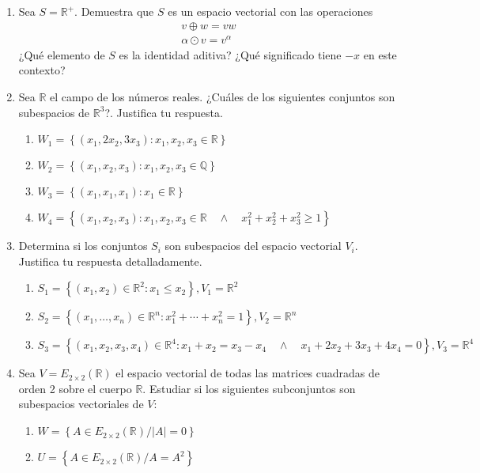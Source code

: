 \documentclass[12pt]{article}
\begin{document}
\begin{enumerate}
  \item Sea $S = \mathbb{R}^+$. Demuestra que $S$ es un espacio vectorial con las operaciones
  \begin{align*}
    v \oplus w = vw\\
    \alpha \odot v = v^{\alpha}
  \end{align*}
  ¿Qué elemento de $S$ es la identidad aditiva? ¿Qué significado tiene $-x$ en este contexto?
  \item Sea $\mathbb{R}$ el campo de los números reales. ¿Cuáles de los siguientes conjuntos son subespacios de $\mathbb{R}^3$?. Justifica tu respuesta.
  \begin{enumerate}
    \item $W_1 = \left\{(x_1,2x_2,3x_3) : x_1,x_2,x_3 \in \mathbb{R}\right\}$
    \item $W_2 = \left\{(x_1,x_2,x_3) : x_1,x_2,x_3 \in \mathbb{Q}\right\}$
    \item $W_3 = \left\{(x_1,x_1,x_1) : x_1 \in \mathbb{R}\right\}$
    \item $W_4 = \left\{(x_1,x_2,x_3) : x_1,x_2,x_3 \in \mathbb{R}\quad \wedge\quad x_1^2+x_2^2+x_3^2\geq1 \right\}$
  \end{enumerate}
  \item Determina si los conjuntos $S_i$ son subespacios del espacio vectorial $V_i$. Justifica tu respuesta detalladamente.
  \begin{enumerate}
    \item $S_1=\left\{(x_1,x_2) \in \mathbb{R}^2 : x_1\leq x_2\right\}, V_1=\mathbb{R}^2$
    \item $S_2=\left\{(x_1,\ldots,x_n) \in \mathbb{R}^n : x_1^2+\cdots+x_n^2=1\right\}, V_2=\mathbb{R}^n$
    \item $S_3=\left\{(x_1,x_2,x_3,x_4) \in \mathbb{R}^4 : x_1+x_2=x_3-x_4\quad\wedge\quad x_1+2x_2+3x_3+4x_4=0\right\}, V_3=\mathbb{R}^4$
  \end{enumerate}
  \item Sea $V=E_{2\times2}(\mathbb{R})$ el espacio vectorial de todas las matrices cuadradas de orden 2 sobre el cuerpo $\mathbb{R}$. Estudiar si los siguientes subconjuntos son subespacios vectoriales de $V$:
  \begin{multicols}{2}
    \begin{enumerate}
      \item $W=\left\{A \in E_{2\times2}(\mathbb{R}) / |A|=0\right\}$
      \item $U=\left\{A \in E_{2\times2}(\mathbb{R}) / A=A^2 \right\}$
    \end{enumerate}    

\end{multicols}
\end{enumerate}
\end{document}
